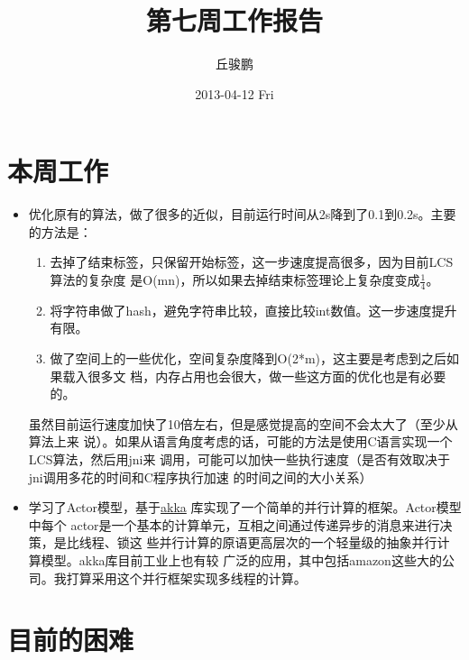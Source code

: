\documentclass[a4paper]{article}
\title{第七周工作报告}
\author{丘骏鹏}
\date{2013-04-12 Fri}
\begin{document}
\maketitle

\setcounter{tocdepth}{3}
\tableofcontents
\vspace*{1cm}


\section{本周工作}
\label{sec-1}

\begin{itemize}
\item 优化原有的算法，做了很多的近似，目前运行时间从2s降到了0.1到0.2s。主要的方法是：
\begin{enumerate}
\item 去掉了结束标签，只保留开始标签，这一步速度提高很多，因为目前LCS算法的复杂度
     是O(mn)，所以如果去掉结束标签理论上复杂度变成\(\frac{1}{4}\)。
\item 将字符串做了hash，避免字符串比较，直接比较int数值。这一步速度提升有限。
\item 做了空间上的一些优化，空间复杂度降到O(2*m)，这主要是考虑到之后如果载入很多文
     档，内存占用也会很大，做一些这方面的优化也是有必要的。
\end{enumerate}
虽然目前运行速度加快了10倍左右，但是感觉提高的空间不会太大了（至少从算法上来
  说）。如果从语言角度考虑的话，可能的方法是使用C语言实现一个LCS算法，然后用jni来
  调用，可能可以加快一些执行速度（是否有效取决于jni调用多花的时间和C程序执行加速
  的时间之间的大小关系）
\item 学习了Actor模型，基于\href{http://akka.io}{akka} 库实现了一个简单的并行计算的框架。Actor模型中每个
  actor是一个基本的计算单元，互相之间通过传递异步的消息来进行决策，是比线程、锁这
  些并行计算的原语更高层次的一个轻量级的抽象并行计算模型。akka库目前工业上也有较
  广泛的应用，其中包括amazon这些大的公司。我打算采用这个并行框架实现多线程的计算。
\end{itemize}
\section{目前的困难}
\label{sec-2}
\end{document}
